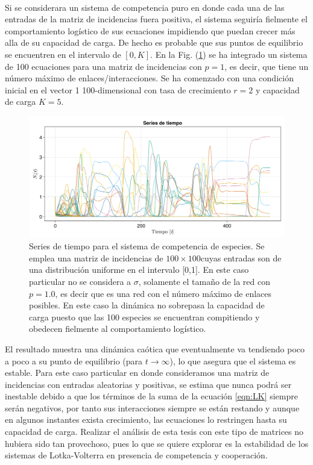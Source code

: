 \\
Si se considerara un sistema de competencia puro en donde cada una de las entradas de la matriz de incidencias fuera positiva, el sistema seguiría fielmente el comportamiento logístico de sus ecuaciones impidiendo que puedan crecer más alla de su capacidad de carga. De hecho es probable que sus puntos de equilibrio se encuentren en el intervalo de $[0,K]$. En la Fig. (\ref{fig:Seriesdetiempopostiva}) se ha integrado un sistema de 100 ecuaciones para una matriz de incidencias con $p=1$, es decir, que tiene un número máximo de enlaces/interacciones. Se ha comenzado con una condición inicial en el vector 1 100-dimensional con tasa de crecimiento $r=2$ y capacidad de carga $K=5$. 
\begin{figure}[h!]
	\centering
	\includegraphics[scale=0.23]{../Imagenes/Seriesdetiempopositiva}
	\caption{Series de tiempo para el sistema de competencia de especies. Se emplea una matriz de incidencias de $100\times 100$cuyas entradas son de una distribución uniforme en el intervalo [0,1]. En este caso particular no se considera a $\sigma$, solamente el tamaño de la red con $p=1.0$, es decir que es una red con el número máximo de enlaces posibles. En este caso la dinámica no sobrepasa la capacidad de carga puesto que las 100 especies se encuentran compitiendo y obedecen fielmente al comportamiento logístico.}
	\label{fig:Seriesdetiempopostiva}
\end{figure}
El resultado muestra una dinámica caótica que eventualmente va tendiendo poco a poco a su punto de equilibrio (para $t\to\infty$), lo que asegura que el sistema es estable. Para este caso particular en donde consideramos una matriz de incidencias con entradas aleatorias y positivas, se estima que nunca podrá ser inestable debido a que los términos de la suma de la ecuación \ref{eqn:LK} siempre serán negativos, por tanto sus interacciones siempre se están restando y aunque en algunos instantes exista crecimiento, las ecuaciones lo restringen hasta su capacidad de carga. Realizar el análisis de esta tesis con este tipo de matrices no hubiera sido tan provechoso, pues lo que se quiere explorar es la estabilidad de los sistemas de Lotka-Volterra en presencia de competencia y cooperación.\\
